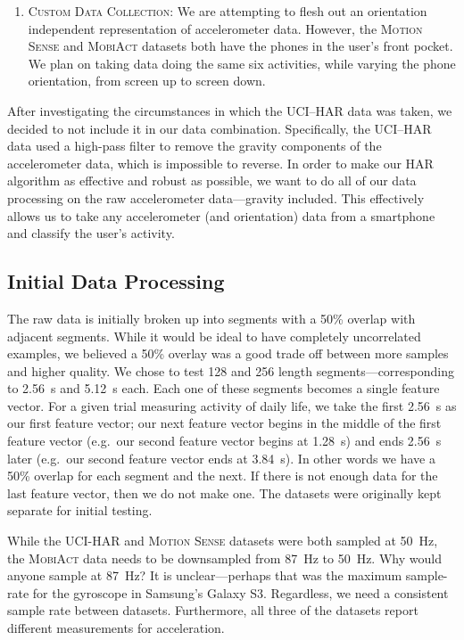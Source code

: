 \begin{enumerate}
    \item \textsc{Custom Data Collection}: We are attempting to flesh out an orientation independent representation of accelerometer data. However, the \textsc{Motion Sense} and \textsc{MobiAct} datasets both have the phones in the user's front pocket. We plan on taking data doing the same six activities, while varying the phone orientation, from screen up to screen down. 
    
\end{enumerate}

After investigating the circumstances in which the UCI--HAR data was taken, we decided to not include it in our data combination. Specifically, the UCI--HAR data used a high-pass filter to remove the gravity components of the accelerometer data, which is impossible to reverse. In order to make our HAR algorithm as effective and robust as possible, we want to do all of our data processing on the raw accelerometer data---gravity included. This effectively allows us to take any accelerometer (and orientation) data from a smartphone and classify the user's activity.

\subsection{Initial Data Processing}
\label{sub:data_proc}

The raw data is initially broken up into  segments with a 50\% overlap with adjacent segments. While it would be ideal to have completely uncorrelated examples, we believed a 50\% overlay was a good trade off between more samples and higher quality.  We chose to test 128 and 256 length segments---corresponding to \SI{2.56}{\s} and \SI{5.12}{\s} each. Each one of these segments becomes a single feature vector. For a given trial measuring  activity of daily life, we take the first \SI{2.56}{\s} as our first feature vector; our next feature vector begins in the middle of the first feature vector (e.g.\  our second feature vector begins at \SI{1.28}{\s}) and ends \SI{2.56}{\s} later (e.g.\ our second feature vector ends at \SI{3.84}{\s}). In other words we have a 50\% overlap for each segment and the next. If there is not enough data for the last feature vector, then we do not make one. The datasets were originally kept separate for initial testing.

While the \textsc{UCI-HAR} and \textsc{Motion Sense} datasets were both sampled at \SI{50}{\Hz}, the \textsc{MobiAct} data needs to be downsampled from \SI{87}{\Hz} to \SI{50}{\Hz}. Why would anyone sample at \SI{87}{\Hz}? It is unclear---perhaps that was the maximum sample-rate for the gyroscope in Samsung's Galaxy S3. Regardless, we need a consistent sample rate between datasets. Furthermore, all three of the datasets report different measurements for acceleration. 

